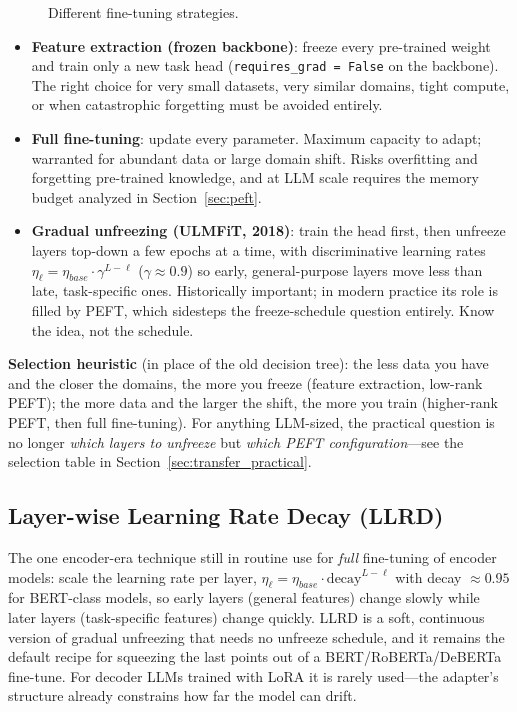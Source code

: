 \begin{figure}[H]
\caption{Different fine-tuning strategies.}
\label{fig:finetuning_strategies}
\end{figure}

\begin{itemize}
    \item \textbf{Feature extraction (frozen backbone)}: freeze every pre-trained weight and train only a new task head (\texttt{requires\_grad = False} on the backbone). The right choice for very small datasets, very similar domains, tight compute, or when catastrophic forgetting must be avoided entirely.
    \item \textbf{Full fine-tuning}: update every parameter. Maximum capacity to adapt; warranted for abundant data or large domain shift. Risks overfitting and forgetting pre-trained knowledge, and at LLM scale requires the memory budget analyzed in Section~\ref{sec:peft}.
    \item \textbf{Gradual unfreezing (ULMFiT, 2018)}: train the head first, then unfreeze layers top-down a few epochs at a time, with discriminative learning rates $\eta_\ell = \eta_{base} \cdot \gamma^{L-\ell}$ ($\gamma \approx 0.9$) so early, general-purpose layers move less than late, task-specific ones. Historically important; in modern practice its role is filled by PEFT, which sidesteps the freeze-schedule question entirely. Know the idea, not the schedule.
\end{itemize}

\textbf{Selection heuristic} (in place of the old decision tree): the less data you have and the closer the domains, the more you freeze (feature extraction, low-rank PEFT); the more data and the larger the shift, the more you train (higher-rank PEFT, then full fine-tuning). For anything LLM-sized, the practical question is no longer \emph{which layers to unfreeze} but \emph{which PEFT configuration}---see the selection table in Section~\ref{sec:transfer_practical}.

\subsection{Layer-wise Learning Rate Decay (LLRD)}

The one encoder-era technique still in routine use for \emph{full} fine-tuning of encoder models: scale the learning rate per layer, $\eta_\ell = \eta_{base} \cdot \text{decay}^{L-\ell}$ with decay $\approx 0.95$ for BERT-class models, so early layers (general features) change slowly while later layers (task-specific features) change quickly. LLRD is a soft, continuous version of gradual unfreezing that needs no unfreeze schedule, and it remains the default recipe for squeezing the last points out of a BERT/RoBERTa/DeBERTa fine-tune. For decoder LLMs trained with LoRA it is rarely used---the adapter's structure already constrains how far the model can drift.

